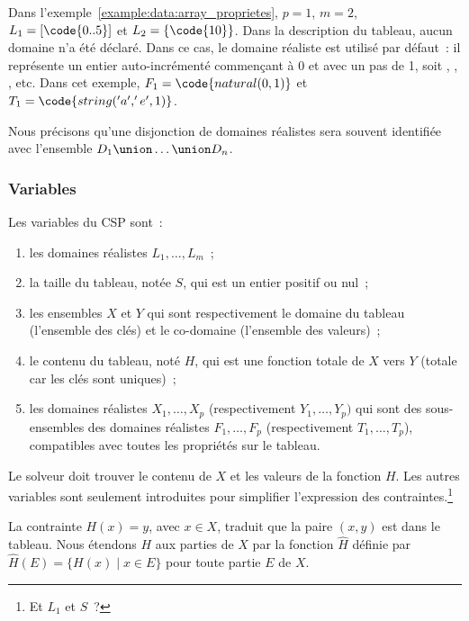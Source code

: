 Dans l'exemple~\ref{example:data:array_proprietes}, $p = 1$, $m = 2$, $L_1 =
[\code{0..5}]$ et $L_2 = \{\code{10}\}$. Dans la description du tableau, aucun
domaine n'a été déclaré. Dans ce cas, le domaine réaliste 
est utilisé par défaut~: il représente un entier auto-incrémenté commençant à 0
et avec un pas de 1, soit , , ,  etc. Dans cet
exemple, $F_1 = \code{natural(0, 1)}$ et $T_1 = \code{string('a', 'e', 1)}$.

Nous précisons qu'une disjonction de domaines réalistes  sera souvent identifiée avec l'ensemble $D_1 \union \dots \union D_n$.

\subsubsection{Variables}

Les variables du CSP sont~:
%
\begin{enumerate}

\item les domaines réalistes $L_1, \dots, L_m$~;

\item la taille du tableau, notée $S$, qui est un entier positif ou nul~;

\item les ensembles $X$ et $Y$ qui sont respectivement le domaine du tableau
(l'ensemble des clés) et le co-domaine (l'ensemble des valeurs)~;

\item le contenu du tableau, noté $H$, qui est une fonction totale de $X$ vers
$Y$ (totale car les clés sont uniques)~;

\item les domaines réalistes $X_1, \dots, X_p$ (respectivement $Y_1, \dots,
Y_p)$ qui sont des sous-ensembles des domaines réalistes $F_1, \dots, F_p$
(respectivement $T_1, \dots, T_p$), compatibles avec toutes les propriétés sur
le tableau.

\end{enumerate}

Le solveur doit trouver le contenu de $X$ et les valeurs de la fonction $H$. Les
autres variables sont seulement introduites pour simplifier l'expression des
contraintes.\footnote{Et $L_1$ et $S$~?}

La contrainte $H(x) = y$, avec $x \in X$, traduit que la paire $(x, y)$ est dans
le tableau. Nous étendons $H$ aux parties de $X$ par la fonction $\hat{H}$
définie par $\hat{H}(E) = \{H(x) \;\vert\; x \in E\}$ pour toute partie $E$ de
$X$.


